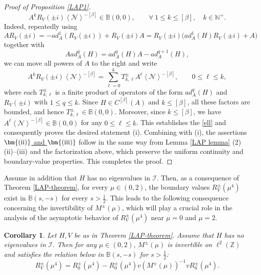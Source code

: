 \documentclass[reqno, 11pt]{amsart}
\newtheorem{corollary}[definition]{Corollary}
\newcommand\Z{\mathbb{Z}}
\newcommand\B{\mathbb{B}}
\newcommand\N{\mathbb{N}}
\newcommand\mcaI{\mathcal{I}}
\newcommand\mcaN{\mathcal{N}}
\numberwithin{equation}{section}
\begin{document}
\begin{proof}[Proof of Proposition \ref{LAP1}]
\begin{equation}
 A^{k}R_V(\pm i)\left<\mcaN\right>^{-[\beta]}\in\B(0,0),\qquad\forall\ 1\leq k\leq[\beta],\quad k\in \N^+.
 \end{equation}
 Indeed, repeatedly using 
 \begin{equation*}
AR_V(\pm i)=-ad^1_{A}(R_V(\pm i))+R_V(\pm i)A= R_V(\pm i)\big(ad^{1}_{A}(H)R_V(\pm i)+A\big)
 \end{equation*}
together with
$$Aad^q_A(H)=ad^q_A(H)A-ad^{q+1}_A(H),$$
we can move all powers of $A$ to the right and write
$$A^{k}R_V(\pm i)\left<\mcaN\right>^{-[\beta]}=\sum\limits_{\ell=0}^{k}T^{\pm}_{k,\ell}A^{\ell}\left<\mcaN\right>^{-[\beta]},\qquad 0\leq \ell\leq k,$$
where each $T^\pm_{k,\ell}$ is a finite product of operators of the form
$ad_A^q(H)$ and $R_V(\pm i)$ with $1\le q\leq k$. Since $H\in C^{[\beta]}(A)$ and
$k\leq[\beta]$, all these factors are bounded, and hence $T^\pm_{k,\ell}\in\B(0,0)$. Moreover, since $k\leq[\beta]$,
 we have $A^{\ell}\left<\mcaN\right>^{-[\beta]}\in\B(0,0)$ for any $0\leq\ell\leq k$. This establishes the \eqref{ell} and consequently proves the desired statement (i).
\vskip0.1cm
Combining with (i), the assertions \underline{$\bm{({\rm ii})}$ and $\bm{({\rm iii})}$} follow in the same way from Lemma \ref{LAP lemma} (2)(ii)--(iii) and the factorization above, which preserve the uniform continuity and boundary-value properties. This completes the proof. 
\end{proof}
Assume in addition that $H$ has no eigenvalues in $\mcaI$. Then, as a consequence of Theorem \ref{LAP-theorem}, for every $\mu\in(0,2)$, the boundary values $R^{\pm}_V(\mu^4)$ exist in $\B(s,-s)$ for every $s>\frac12$. This leads to the following consequence concerning the invertibility of $M^{\pm}(\mu)$, which will play a crucial role in the analysis of the asymptotic behavior of $R^{\pm}_V(\mu^4)$ near $\mu=0$ and $\mu=2$.
\begin{corollary}\label{corollary inverse of M}
{ Let $H,V$ be as in Theorem \ref{LAP-theorem}. Assume that $H$ has no eigenvalues in $\mcaI$. Then for any $\mu\in(0,2)$, $M^{\pm}(\mu)$ is invertible on $\ell^2(\Z)$ and satisfies the relation below in $\B(s,-s)$ for $s>\frac{1}{2}$:
\begin{equation}\label{inverti relation}
R^{\pm}_V(\mu^4)=R^{\pm}_{0}(\mu^4)-R^{\pm}_0(\mu^4)v\left(M^{\pm}(\mu)\right)^{-1}vR^{\pm}_0(\mu^4).
\end{equation}
}
\end{corollary}
\end{document}
